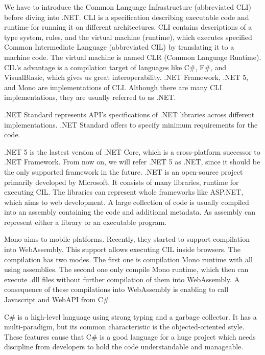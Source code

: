 We have to introduce the Common Language Infrastructure (abbreviated CLI)  before diving into .NET.
CLI is a specification describing executable code and runtime for running it on different architectures.
CLI contains descriptions of a type system, rules, and the virtual machine (runtime), which executes specified Common Intermediate Language (abbreviated CIL) by translating it to a machine code. 
The virtual machine is named CLR (Common Language Runtime).
CIL's advantage is a compilation target of languages like C\#, F\#, and VisualBlasic, which gives us great interoperability.
.NET Framework, .NET 5, and Mono are implementations of CLI.
Although there are many CLI implementations, they are usually referred to as .NET.
\par
.NET Standard represents API's specifications of .NET libraries across different implementations.
.NET Standard offers to specify minimum requirements for the code.
\par
.NET 5  is the lastest version of .NET Core, which is a cross-platform successor to .NET Framework.
From now on, we will refer .NET 5 as .NET, since it should be the only supported framework in the future.
.NET is an open-source project primarily developed by Microsoft.
It consists of many libraries, runtime for executing CIL.
The libraries can represent whole frameworks like ASP.NET, which aims to web development.
A large collection of code is usually compiled into an assembly containing the code and additional metadata.
As assembly can represent either a library or an executable program.
\par
{}
Mono aims to mobile platforms. 
Recently, they started to support compilation  into WebAssembly.
This support allows executing CIL inside browsers.
The compilation has two modes.
The first one is compilation Mono runtime with all using assemblies.
The second one only compile Mono runtime, which then can execute .dll files without further compilation of them into WebAssembly.
A consequence of these compilations into WebAssembly is enabling to call Javascript and WebAPI from C\#.
\par
C\# is a high-level language using strong typing and a garbage collector.
It has a multi-paradigm, but its common characteristic is the objected-oriented style.
These features cause that C\# is a good language for a huge project which needs discipline from developers to hold the code understandable and manageable.

